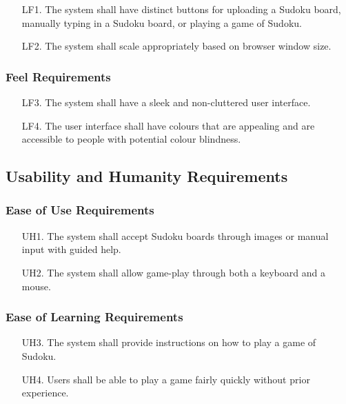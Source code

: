 \documentclass[11pt]{article}
\begin{document}
\begin{enumerate} %
    \item [LF1.] The system shall have distinct buttons for uploading a Sudoku board, manually typing in a Sudoku board, or playing a game of Sudoku.
    \item [LF2.] The system shall scale appropriately based on browser window size.
\end{enumerate}

\subsubsection{Feel Requirements}

\begin{enumerate} %
    \item [LF3.] The system shall have a sleek and non-cluttered user interface.
    \item [LF4.] The user interface shall have colours that are appealing and are accessible to people with potential colour blindness.
\end{enumerate}

\subsection{Usability and Humanity Requirements}

\subsubsection{Ease of Use Requirements}

\begin{enumerate}
    \item [UH1.] The system shall accept Sudoku boards through images or manual input with guided help.
    
    \item [UH2.] The system shall allow game-play through both a keyboard and a mouse.
\end{enumerate}

\subsubsection{Ease of Learning Requirements}
\begin{enumerate}
    \item [UH3.] The system shall provide instructions on how to play a game of Sudoku.
    
    \item [UH4.] Users shall be able to play a game fairly quickly without prior experience.
\end{enumerate}
\end{document}

